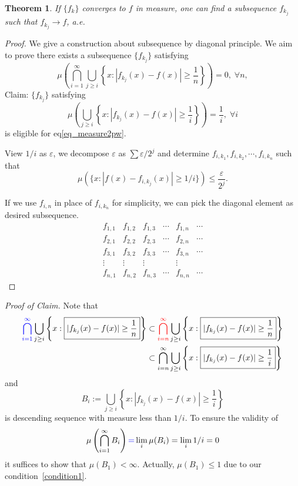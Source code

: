 \documentclass{article}
\numberwithin{equation}{section}
\newtheorem{Theorem}{Theorem}[section] %
\begin{document}
\begin{Theorem}
    If $\{f_{k}\}$ converges to $f$ in measure, one can find a subsequence $f_{k_{j}}$ such that $f_{k_j}\to f$, a.e.
\end{Theorem}

\begin{proof} We give a construction about subsequence by diagonal principle. We aim to prove there exists a subsequence $\{f_{k_j}\}$ satisfying
\begin{equation}
\label{eq_measure2pw}
    \mu\left(\bigcap _{i= 1}^{\infty} \bigcup_{j\geq i} \left\{x: \boxed{|f_{k_j}(x)-f(x)|\geq \frac{1}{n}}\right\}\right) = 0,\;\forall n,
\end{equation}
Claim: $\{f_{k_j}\}$ satisfying
$$
\mu\left(\bigcup_{j\geq i} \left\{x: \boxed{|f_{k_j}(x)-f(x)|\geq \frac{1}{i}}\right\}\right) = \frac{1}{i}, \;\forall i
$$
is eligible for eq\eqref{eq_measure2pw}.

View $1/i$ as $\varepsilon$, we decompose $\varepsilon$ as $\sum \varepsilon/2^{j}$ and determine $f_{i,k_1}, f_{i,k_2},\cdots, f_{i,k_n}$ such that 
\begin{equation}
\label{condition1}
    \mu\left(\{x: |f(x)-f_{i,k_j}(x)|\geq 1/i\}\right) \leq \frac{\varepsilon}{2^j}.
\end{equation}


If we use $f_{i,n}$ in place of $f_{i,k_n}$ for simplicity, we can pick the diagonal element as desired subsequence.
$$
\begin{array}{cccccc}
    \boxed{f_{1,1}} & f_{1,2} & f_{1,3} & \cdots & f_{1,n} & \cdots\\
    f_{2,1} & \boxed{f_{2,2}} & f_{2,3} & \cdots & f_{2,n} & \cdots\\
    f_{3,1} & f_{3,2} & \boxed{f_{3,3}} & \cdots & f_{3,n} & \cdots\\
    \vdots  & \vdots  & \vdots  &    &   \vdots&\\
    f_{n,1} & f_{n,2} & f_{n,3} & \cdots & \boxed{f_{n,n}} & \cdots
\end{array}
$$
\end{proof}

\textit{Proof of Claim.} Note that 
$$
\begin{aligned}
    {\color{blue}\bigcap _{i= 1}^{\infty}} \bigcup_{j\geq i} \left\{x: \boxed{|f_{k_j}(x)-f(x)|\geq \frac{1}{n}}\right\} 
    &\subset 
    {\color{red}\bigcap _{i= n}^{\infty}} \bigcup_{j\geq i} \left\{x: \boxed{|f_{k_j}(x)-f(x)|\geq \frac{1}{n}}\right\}
    \\
    &\subset 
    \bigcap _{i= n}^{\infty} \bigcup_{j\geq i} \left\{x: \boxed{|f_{k_j}(x)-f(x)|\geq \frac{1}{i}}\right\}
\end{aligned}
$$
and 
$$
B_{i}:= \bigcup_{j\geq i} \left\{x: \boxed{|f_{k_j}(x)-f(x)|\geq \frac{1}{i}}\right\}
$$
is descending sequence with measure less than $1/i$. To ensure the validity of 
$$
\mu\left(\bigcap_{i=1}^{\infty}B_{i}\right) {\color{blue}=} \lim_{i}\mu(B_{i}) =\lim_{i} 1/i=0
$$
it suffices to show that $\mu(B_1)<\infty$. Actually, $\mu(B_1)\leq 1$ due to our condition~\eqref{condition1}.
\end{document}
